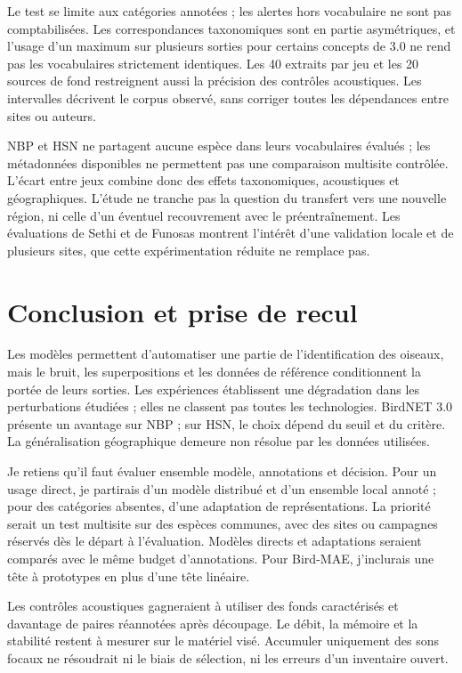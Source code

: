 \documentclass{technology_watch}
\begin{document}
Le test se limite aux catégories annotées ; les alertes hors vocabulaire
ne sont pas comptabilisées. Les correspondances taxonomiques sont en partie
asymétriques, et l'usage d'un maximum sur plusieurs sorties pour certains
concepts de 3.0 ne rend pas les vocabulaires strictement identiques.
Les 40 extraits par jeu et les 20 sources de fond restreignent aussi la
précision des contrôles acoustiques. Les intervalles décrivent le corpus
observé, sans corriger toutes les dépendances entre sites ou auteurs.

NBP et HSN ne partagent aucune espèce dans leurs vocabulaires évalués ; les
métadonnées disponibles ne permettent pas une comparaison multisite
contrôlée. L'écart entre jeux combine donc des effets taxonomiques, acoustiques
et géographiques. L'étude ne tranche pas la question du transfert vers une
nouvelle région, ni celle d'un éventuel recouvrement avec le préentraînement.
Les évaluations de Sethi et de Funosas montrent l'intérêt d'une validation
locale et de plusieurs sites\cite{sethi2024,funosas2026}, que cette
expérimentation réduite ne remplace pas.

\section{Conclusion et prise de recul}

Les modèles permettent d'automatiser une partie de l'identification des oiseaux,
mais le bruit, les superpositions et les données de référence conditionnent
la portée de leurs sorties. Les expériences établissent une dégradation dans
les perturbations étudiées ; elles ne classent pas toutes les technologies.
BirdNET 3.0 présente un avantage sur NBP ; sur HSN, le choix dépend du seuil
et du critère. La généralisation géographique demeure
non résolue par les données utilisées.

Je retiens qu'il faut évaluer ensemble modèle, annotations et décision.
Pour un usage direct, je partirais d'un modèle distribué et d'un ensemble
local annoté ; pour des catégories absentes, d'une adaptation de
représentations. La priorité serait un test multisite sur des espèces
communes, avec des sites ou campagnes réservés dès le départ à l'évaluation.
Modèles directs et adaptations seraient comparés avec le même budget
d'annotations. Pour Bird-MAE, j'inclurais une tête à prototypes en plus
d'une tête linéaire.

Les contrôles acoustiques gagneraient à utiliser des fonds caractérisés et
davantage de paires réannotées après découpage. Le débit, la mémoire et la
stabilité restent à mesurer sur le matériel visé. Accumuler uniquement des
sons focaux ne résoudrait ni le biais de sélection, ni les erreurs d'un
inventaire ouvert.

\FloatBarrier
\label{report:body-end}
\clearpage


\end{document}
